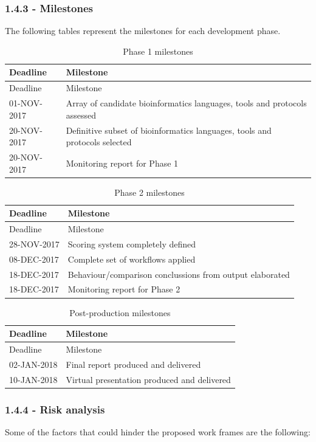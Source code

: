 \documentclass[]{article}
\begin{document}
\subsubsection{1.4.3 - Milestones}\label{milestones}

The following tables represent the milestones for each development
phase.

\begin{longtable}[c]{@{}ll@{}}
\caption{Phase 1 milestones}\tabularnewline
\toprule
Deadline & Milestone\tabularnewline
\midrule
\endfirsthead
\toprule
Deadline & Milestone\tabularnewline
\midrule
\endhead
01-NOV-2017 & Array of candidate bioinformatics languages, tools and
protocols assessed\tabularnewline
20-NOV-2017 & Definitive subset of bioinformatics languages, tools and
protocols selected\tabularnewline
20-NOV-2017 & Monitoring report for Phase 1\tabularnewline
\bottomrule
\end{longtable}

\begin{longtable}[c]{@{}ll@{}}
\caption{Phase 2 milestones}\tabularnewline
\toprule
Deadline & Milestone\tabularnewline
\midrule
\endfirsthead
\toprule
Deadline & Milestone\tabularnewline
\midrule
\endhead
28-NOV-2017 & Scoring system completely defined\tabularnewline
08-DEC-2017 & Complete set of workflows applied\tabularnewline
18-DEC-2017 & Behaviour/comparison conclussions from output
elaborated\tabularnewline
18-DEC-2017 & Monitoring report for Phase 2\tabularnewline
\bottomrule
\end{longtable}

\begin{longtable}[c]{@{}ll@{}}
\caption{Post-production milestones}\tabularnewline
\toprule
Deadline & Milestone\tabularnewline
\midrule
\endfirsthead
\toprule
Deadline & Milestone\tabularnewline
\midrule
\endhead
02-JAN-2018 & Final report produced and delivered\tabularnewline
10-JAN-2018 & Virtual presentation produced and delivered\tabularnewline
\bottomrule
\end{longtable}

\subsubsection{1.4.4 - Risk analysis}\label{risk-analysis}

Some of the factors that could hinder the proposed work frames are the
following:
\end{document}
